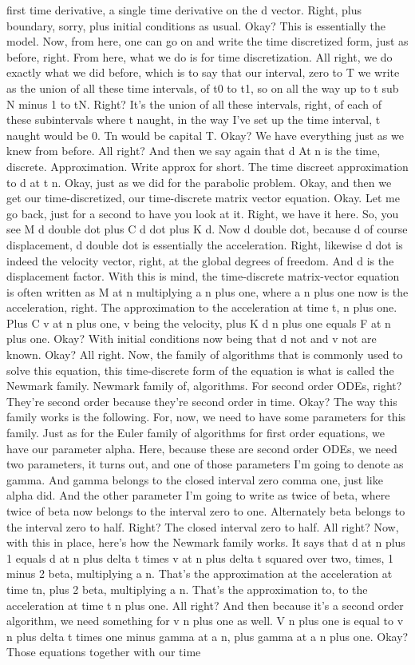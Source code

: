 \documentclass[10pt]{article}
\begin{document}
first time derivative, a single time derivative on the d vector. Right, plus boundary, sorry, plus initial conditions as usual. Okay? This is essentially the model. Now, from here, one can go on and write the time discretized form, just as before, right. From here, what we do is for time discretization. All right, we do exactly what we did before, which is to say that our interval, zero to T we write as the union of all these time intervals, of t0 to t1, so on all the way up to t sub N minus 1 to tN. Right? It's the union of all these intervals, right, of each of these subintervals where t naught, in the way I've set up the time interval, t naught would be 0. Tn would be capital T. Okay? We have everything just as we knew from before. All right? And then we say again that d At n is the time, discrete. Approximation. Write approx for short. The time discreet approximation to d at t n. Okay, just as we did for the parabolic problem. Okay, and then we get our time-discretized, our time-discrete matrix vector equation. Okay. Let me go back, just for a second to have you look at it. Right, we have it here. So, you see M d double dot plus C d dot plus K d. Now d double dot, because d of course displacement, d double dot is essentially the acceleration. Right, likewise d dot is indeed the velocity vector, right, at the global degrees of freedom. And d is the displacement factor. With this is mind, the time-discrete matrix-vector equation is often written as M at n multiplying a n plus one, where a n plus one now is the acceleration, right. The approximation to the acceleration at time t, n plus one. Plus C v at n plus one, v being the velocity, plus K d n plus one equals F at n plus one. Okay? With initial conditions now being that d not and v not are known. Okay? All right. Now, the family of algorithms that is commonly used to solve this equation, this time-discrete form of the equation is what is called the Newmark family. Newmark family of, algorithms. For second order ODEs, right? They're second order because they're second order in time. Okay? The way this family works is the following. For, now, we need to have some parameters for this family. Just as for the Euler family of algorithms for first order equations, we have our parameter alpha. Here, because these are second order ODEs, we need two parameters, it turns out, and one of those parameters I'm going to denote as gamma. And gamma belongs to the closed interval zero comma one, just like alpha did. And the other parameter I'm going to write as twice of beta, where twice of beta now belongs to the interval zero to one. Alternately beta belongs to the interval zero to half. Right? The closed interval zero to half. All right? Now, with this in place, here's how the Newmark family works. It says that d at n plus 1 equals d at n plus delta t times v at n plus delta t squared over two, times, 1 minus 2 beta, multiplying a n. That's the approximation at the acceleration at time tn, plus 2 beta, multiplying a n. That's the approximation to, to the acceleration at time t n plus one. All right? And then because it's a second order algorithm, we need something for v n plus one as well. V n plus one is equal to v n plus delta t times one minus gamma at a n, plus gamma at a n plus one. Okay? Those equations together with our time 
\end{document}
